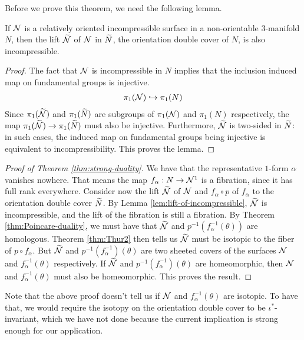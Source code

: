Before we prove this theorem, we need the following lemma.
\begin{lem}
  \label{lem:lift-of-incompressible}
  If $\mathcal{N}$ is a relatively oriented incompressible surface in a non-orientable $3$-manifold $N$, then the lift $\widetilde{\mathcal{N}}$ of $\mathcal{N}$ in $\widetilde{N}$, the orientation double cover of $N$, is also incompressible.
\end{lem}
\begin{proof}
  The fact that $\mathcal{N}$ is incompressible in $N$ implies that the inclusion induced map on fundamental groups is injective.
  \begin{align*}
    \pi_1(\mathcal{N}) \hookrightarrow \pi_1(N)
  \end{align*}
  Since $\pi_1(\widetilde{\mathcal{N}})$ and $\pi_1(\widetilde{N})$ are subgroups of $\pi_1(\mathcal{N})$ and $\pi_1(N)$ respectively, the map $\pi_1(\widetilde{\mathcal{N}}) \to \pi_1(\widetilde{N})$ must also be injective.
  Furthermore, $\widetilde{\mathcal{N}}$ is two-sided in $\widetilde{N}$: in such cases, the induced map on fundamental groups being injective is equivalent to incompressibility.
  This proves the lemma.
\end{proof}

\begin{proof}[Proof of Theorem \ref{thm:strong-duality}]
  We have that the representative $1$-form $\alpha$ vanishes nowhere.
  That means the map $f_{\alpha}: N \to \mathcal{N}^1$ is a fibration, since it has full rank everywhere.
  Consider now the lift $\widetilde{\mathcal{N}}$ of $\mathcal{N}$ and $f_{\alpha} \circ p$ of $f_{\alpha}$ to the orientation double cover $\widetilde{N}$.
  By Lemma \ref{lem:lift-of-incompressible}, $\widetilde{\mathcal{N}}$ is incompressible, and the lift of the fibration is still a fibration.
  By Theorem \ref{thm:Poincare-duality}, we must have that $\widetilde{\mathcal{N}}$ and $p^{-1}(f_{\alpha}^{-1}(\theta))$ are homologous.
  Theorem \ref{thm:Thur2} then tells us $\widetilde{\mathcal{N}}$ must be isotopic to the fiber of $p \circ f_{\alpha}$.
  But $\widetilde{\mathcal{N}}$ and $p^{-1}(f_{\alpha}^{-1})(\theta)$ are two sheeted covers of the surfaces $\mathcal{N}$ and $f_{\alpha}^{-1}(\theta)$ respectively.
  If $\widetilde{\mathcal{N}}$ and $p^{-1}(f_{\alpha}^{-1})(\theta)$ are homeomorphic, then $\mathcal{N}$ and $f_{\alpha}^{-1}(\theta)$ must also be homeomorphic.
  This proves the result.
\end{proof}

\begin{rem}
  Note that the above proof doesn't tell us if $\mathcal{N}$ and $f_{\alpha}^{-1}(\theta)$ are isotopic.
  To have that, we would require the isotopy on the orientation double cover to be $\iota^{\ast}$-invariant, which we have not done because the current implication is strong enough for our application.
\end{rem}

